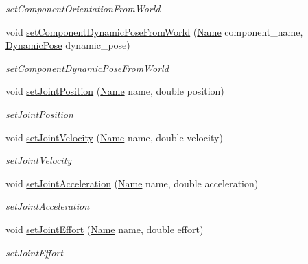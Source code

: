 \begin{DoxyCompactItemize}
\begin{DoxyCompactList}\small\item\em set\+Component\+Orientation\+From\+World \end{DoxyCompactList}\item 
void \hyperlink{classrobotis__manipulator_1_1_manipulator_a904b6dccb05e5edaae2c7e29d54fd197}{set\+Component\+Dynamic\+Pose\+From\+World} (\hyperlink{namespacerobotis__manipulator_a08c2d25e77a01ad75b9bb740f8ce4765}{Name} component\+\_\+name, \hyperlink{structrobotis__manipulator_1_1_dynamic_pose}{Dynamic\+Pose} dynamic\+\_\+pose)
\begin{DoxyCompactList}\small\item\em set\+Component\+Dynamic\+Pose\+From\+World \end{DoxyCompactList}\item 
void \hyperlink{classrobotis__manipulator_1_1_manipulator_acedaab5099be0997bb2aae307c81fa80}{set\+Joint\+Position} (\hyperlink{namespacerobotis__manipulator_a08c2d25e77a01ad75b9bb740f8ce4765}{Name} name, double position)
\begin{DoxyCompactList}\small\item\em set\+Joint\+Position \end{DoxyCompactList}\item 
void \hyperlink{classrobotis__manipulator_1_1_manipulator_aa8d57910111e9d1ec39313d2527b6c08}{set\+Joint\+Velocity} (\hyperlink{namespacerobotis__manipulator_a08c2d25e77a01ad75b9bb740f8ce4765}{Name} name, double velocity)
\begin{DoxyCompactList}\small\item\em set\+Joint\+Velocity \end{DoxyCompactList}\item 
void \hyperlink{classrobotis__manipulator_1_1_manipulator_a07211b030e35d36d64c620eac5e45f92}{set\+Joint\+Acceleration} (\hyperlink{namespacerobotis__manipulator_a08c2d25e77a01ad75b9bb740f8ce4765}{Name} name, double acceleration)
\begin{DoxyCompactList}\small\item\em set\+Joint\+Acceleration \end{DoxyCompactList}\item 
void \hyperlink{classrobotis__manipulator_1_1_manipulator_aa8b95ee42ecd2e93496f546c144609bf}{set\+Joint\+Effort} (\hyperlink{namespacerobotis__manipulator_a08c2d25e77a01ad75b9bb740f8ce4765}{Name} name, double effort)
\begin{DoxyCompactList}\small\item\em set\+Joint\+Effort \end{DoxyCompactList}\item 

\end{DoxyCompactItemize}
